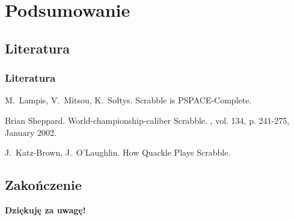 \documentclass[10pt,a4paper]{beamer}
\begin{document}
\section{Podsumowanie}
\subsection{Literatura}

\begin{frame}
	\frametitle<presentation>{Literatura}
	\begin{thebibliography}{10}
		\beamertemplatearticlebibitems
    		M.~Lampis, V.~Mitsou, K.~Sołtys.
    		\newblock Scrabble is PSPACE-Complete.

		\beamertemplatebookbibitems
			Brian Sheppard.
			\newblock World-championship-caliber Scrabble.
			, vol. 134, p. 241-275, January 2002.
  		
  		\beamertemplatearticlebibitems
  			J.~Katz-Brown, J.~O'Laughlin.
    		\newblock How Quackle Plays Scrabble.
	\end{thebibliography}
\end{frame}

\subsection{Zakończenie}

\begin{frame}
	\begin{center}
		\LARGE{\textbf{Dziękuję za uwagę!}}
	\end{center}
\end{frame}
\end{document}
